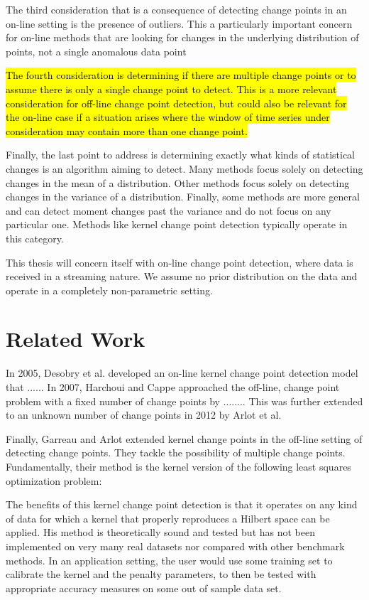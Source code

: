 The third consideration that is a consequence of detecting change points in an on-line setting is the presence of outliers. This a particularly important concern for on-line methods that are looking for changes in the underlying distribution of points, not a single anomalous data point

\hl{The fourth consideration is determining if there are multiple change points or to assume there is only a single change point to detect. This is a more relevant consideration for off-line change point detection, but could also be relevant for the on-line case if a situation arises where the window of time series under consideration may contain more than one change point.}

Finally, the last point to address is determining exactly what kinds of statistical changes is an algorithm aiming to detect. Many methods focus solely on detecting changes in the mean of a distribution. Other methods focus solely on detecting changes in the variance of a distribution. Finally, some methods are more general and can detect moment changes past the variance and do not focus on any particular one. Methods like kernel change point detection typically operate in this category. 

This thesis will concern itself with on-line change point detection, where data is received in a streaming nature. We assume no prior distribution on the data and operate in a completely non-parametric setting. 
\section{Related Work}
In 2005, Desobry et al. \cite{desobry2005online} developed an on-line kernel change point detection model that ...... In 2007, Harchoui and Cappe approached the off-line, change point problem with a fixed number of change points by ........ This was further extended to an unknown number of change points in 2012 by Arlot et al. \cite{arlot2012kernel} 

Finally, Garreau and Arlot extended kernel change points  in the off-line setting of detecting change points. They tackle the possibility of multiple change points. Fundamentally, their method is the kernel version of the following least squares optimization problem:


The benefits of this kernel change point detection is that it operates on any kind of data for which a kernel that properly reproduces a Hilbert space can be applied.  His method is theoretically sound and tested but has not been implemented on very many real datasets nor compared with other benchmark methods. In an application setting, the user would use some training set to calibrate the kernel and the penalty parameters, to then be tested with appropriate accuracy measures on some out of sample data set.


